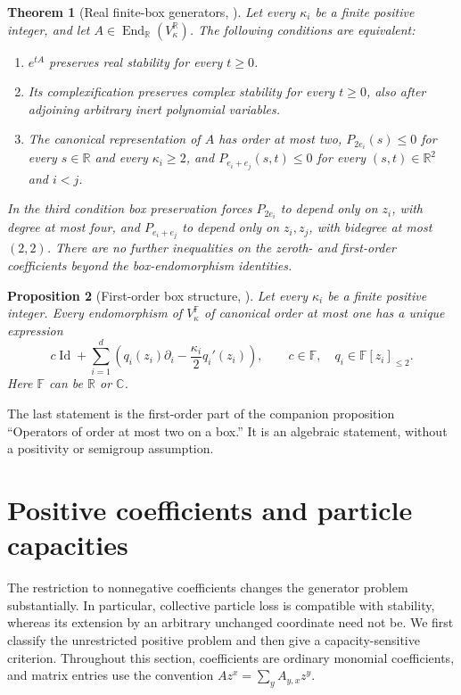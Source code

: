 \documentclass[reqno]{amsart}
\newtheorem{theorem}{Theorem}[section]
\newtheorem{proposition}[theorem]{Proposition}
\theoremstyle{definition}
\theoremstyle{remark}
\newcommand{\C}{\mathbb C}
\newcommand{\R}{\mathbb R}
\DeclareMathOperator{\Id}{Id}
\begin{document}
\begin{theorem}[Real finite-box generators, \cite{WeiGenerators2026}]
\label{gen:main-real}
Let every \(\kappa_i\) be a finite positive integer, and let
\(A\in\operatorname{End}_{\R}(V_\kappa^{\R})\). The following
conditions are equivalent:
\begin{enumerate}
\item \(e^{tA}\) preserves real stability for every \(t\ge0\).
\item Its complexification preserves complex stability for every
      \(t\ge0\), also after adjoining arbitrary inert polynomial variables.
\item The canonical representation of \(A\) has order at most two,
      \(P_{2e_i}(s)\le0\) for every \(s\in\R\) and every
      \(\kappa_i\ge2\), and \(P_{e_i+e_j}(s,t)\le0\) for
      every \((s,t)\in\R^2\) and \(i<j\).
\end{enumerate}
In the third condition box preservation forces \(P_{2e_i}\) to
depend only on \(z_i\), with degree at most four, and
\(P_{e_i+e_j}\) to depend only on \(z_i,z_j\), with bidegree
at most \((2,2)\). There are no further inequalities on the
zeroth- and first-order coefficients beyond the box-endomorphism
identities.
\end{theorem}

\begin{proposition}[First-order box structure, \cite{WeiGenerators2026}]
\label{gen:box-decomposition}
Let every \(\kappa_i\) be a finite positive integer. Every
endomorphism of \(V_\kappa^{\mathbb F}\) of canonical order at
most one has a unique expression
\[
 c\Id+\sum_{i=1}^d
 \left(q_i(z_i)\partial_i-\frac{\kappa_i}{2}q_i'(z_i)\right),
 \qquad c\in\mathbb F,\quad q_i\in\mathbb F[z_i]_{\le2}.
\]
Here \(\mathbb F\) can be \(\R\) or \(\C\).
\end{proposition}

The last statement is the first-order part of the companion proposition
``Operators of order at most two on a box.'' It is an algebraic statement,
without a positivity or semigroup assumption.


\section{Positive coefficients and particle capacities}
\label{pos:section}

The restriction to nonnegative coefficients changes the generator problem substantially.
In particular, collective particle loss is compatible with stability, whereas its extension
by an arbitrary unchanged coordinate need not be.  We first classify the unrestricted
positive problem and then give a capacity-sensitive criterion.  Throughout this section,
coefficients are ordinary monomial coefficients, and matrix entries use the convention
\(Az^x=\sum_y A_{y,x}z^y\).
\end{document}
